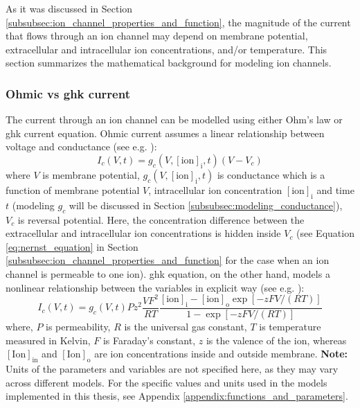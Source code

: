 \documentclass[../main.tex]{subfiles}
\begin{document}
As it was discussed in Section \ref{subsubsec:ion_channel_properties_and_function}, the magnitude of the current that flows through an ion channel may depend on membrane potential, extracellular and intracellular ion concentrations, and/or temperature. This section summarizes the mathematical background for modeling ion channels.

\subsubsection{Ohmic vs \texorpdfstring{\gls{ghk}}{GHK} current}

The current through an ion channel can be modelled using either Ohm's law or
\gls{ghk} current equation. Ohmic current assumes a linear relationship between
voltage and conductance (see e.g. \parencite{huguenardSimulationCurrentsInvolved1992,amarilloInterplaySevenSubthreshold2014}):
\begin{equation}\label{eq:ohmic_current}
    I_{c}(V,t) = g_c(V,[\text{ion}]_{\text{i}},t)(V - V_c)
\end{equation}
where $V$ is membrane potential, $g_c(V,[\text{ion}]_{\text{i}},t)$ is conductance which is a function of membrane potential $V$, intracellular ion concentration $[\text{ion}]_{\text{i}}$ and time $t$ (modeling $g_c$ will be discussed in Section \ref{subsubsec:modeling_conductance}), $V_c$ is reversal potential. Here, the concentration difference between the extracellular and intracellular ion concentrations is hidden inside $V_c$ (see Equation \ref{eq:nernst_equation} in Section \ref{subsubsec:ion_channel_properties_and_function} for the case when an ion channel is permeable to one ion).
\gls{ghk} equation, on the other hand, models a nonlinear relationship between the variables in
explicit way (see e.g. \parencite{huguenardSimulationCurrentsInvolved1992,destexheDendriticLowthresholdCalcium1998}):
\begin{equation}\label{eq:ghk_current}
    I_c(V,t) = g_c(V,t) P z^2 \frac{VF^2}{RT}\frac{[\text{ion}]_{\text{i}} - [\text{ion}]_{\text{o}} \exp{[-zFV/(RT)]} }{1 - \exp{[-zFV/(RT)]}}
\end{equation}
where, $P$ is permeability, $R$ is the universal gas constant, $T$ is temperature measured
in Kelvin, $F$ is Faraday's constant, $z$ is the valence of the ion,
whereas $[\text{Ion}]_{\text{in}}$ and $[\text{Ion}]_{\text{o}}$ are ion concentrations inside and outside membrane. \textbf{Note:} Units of the parameters and variables are not specified here, as they may vary across different models. For the specific values and units used in the models implemented in this thesis, see Appendix \ref{appendix:functions_and_parameters}.
\end{document}
